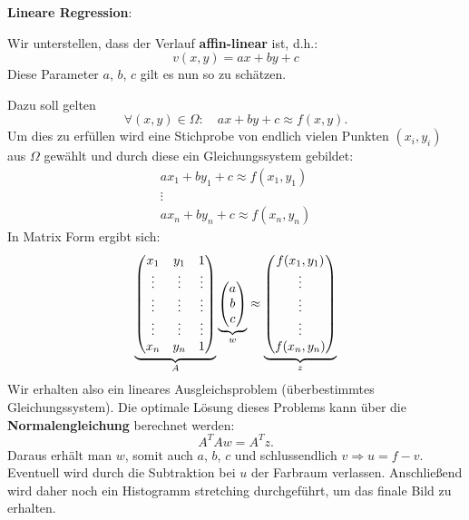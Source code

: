 \begin{enumerate}[label = \alph*)]
    \item \textbf{Lineare Regression}: \\
  \begin{minipage}[c]{0.6\linewidth}
  \item[] Wir unterstellen, dass der Verlauf \textbf{affin-linear} ist, d.h.:
          \[v(x,y) = a x + b y + c\]
          Diese Parameter $a$, $b$, $c$ gilt es nun so zu schätzen.
    \end{minipage}
    \hfill
    \begin{minipage}[c]{0.35\linewidth}
              \begin{center}
      \end{center}
    \end{minipage}
    Dazu soll gelten
    \[\forall (x,y) \in \Omega \colon\quad ax+by+c \approx f(x,y).\]
    Um dies zu erfüllen wird eine Stichprobe von endlich vielen Punkten $(x_i,y_i)$ aus $\Omega$ gewählt und durch diese ein Gleichungssystem gebildet:
    \begin{gather*}
    ax_1+by_1+c \approx f(x_1,y_1)\\
    \vdots \\
    ax_n+by_n+c \approx f(x_n,y_n)
    \end{gather*}
    In Matrix Form ergibt sich:
    \[\underbrace{\begin{pmatrix} x_1 & y_1 & 1 \\ \vdots & \vdots & \vdots \\ \vdots & \vdots & \vdots \\ \vdots & \vdots & \vdots \\ x_n & y_n & 1 \end{pmatrix}}_{A} \underbrace{\begin{pmatrix} a \\ b \\ c \end{pmatrix}}_{w} \approx \underbrace{\begin{pmatrix} f(x_1,y_1) \\ \vdots \\ \vdots \\ \vdots \\ f(x_n,y_n) \end{pmatrix}}_{z}\]
    Wir erhalten also ein lineares Ausgleichsproblem (überbestimmtes Gleichungssystem).
    Die optimale Lösung dieses Problems kann über die \textbf{Normalengleichung} berechnet werden:
    \[A^T A w = A^T z.\]
    Daraus erhält man $w$, somit auch $a$, $b$, $c$ und schlussendlich $v \Rightarrow u = f-v$.\\
    Eventuell wird durch die Subtraktion bei $u$ der Farbraum verlassen.
    Anschließend wird daher noch ein Histogramm stretching durchgeführt, um das finale Bild zu erhalten.


\end{enumerate}
